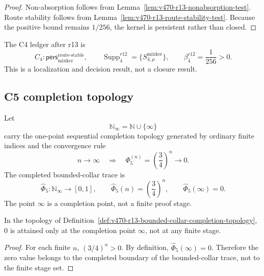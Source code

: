 \begin{proof}
Non-absorption follows from Lemma~\ref{lem:v470-r13-nonabsorption-test}.  Route
stability follows from Lemma~\ref{lem:v470-r13-route-stability-test}.  Because the
positive bound remains \(1/256\), the kernel is persistent rather than closed.
\end{proof}

\begin{corollary}[r13 C4 status]
\label{cor:v470-r13-c4-status}
The C4 ledger after r13 is
\[
C_4:\mathsf{pers}_{\mathrm{mixker}}^{\mathrm{route\mbox{-}stable}},
\qquad
\operatorname{Supp}_4^{r12}=\{S_{4,\mu}^{\mathrm{mixker}}\},
\qquad
\beta_4^{r12}=\frac1{256}>0.
\]
This is a localization and decision result, not a closure result.
\end{corollary}

\subsection{C5 completion topology}
\label{subsec:v470-r13-c5-completion-topology}

\begin{definition}
\label{def:v470-r13-bounded-collar-completion-topology}
Let
\[
\mathbb N_{\infty}=\mathbb N\cup\{\infty\}
\]
carry the one-point sequential completion topology generated by ordinary finite
indices and the convergence rule
\[
n\to\infty \quad\Longrightarrow\quad
\Phi_5^{(n)}=\left(\frac34\right)^n \to 0.
\]
The completed bounded-collar trace is
\[
\widehat{\Phi}_5:\mathbb N_{\infty}\to[0,1],
\qquad
\widehat{\Phi}_5(n)=\left(\frac34\right)^n,
\qquad
\widehat{\Phi}_5(\infty)=0.
\]
The point \(\infty\) is a completion point, not a finite proof stage.
\end{definition}

\begin{lemma}
\label{lem:v470-r13-completion-not-finite-discharge}
In the topology of Definition~\ref{def:v470-r13-bounded-collar-completion-topology},
\(0\) is attained only at the completion point \(\infty\), not at any finite
stage.
\end{lemma}

\begin{proof}
For each finite \(n\), \((3/4)^n>0\).  By definition,
\(\widehat{\Phi}_5(\infty)=0\).  Therefore the zero value belongs to the
completed boundary of the bounded-collar trace, not to the finite stage set.
\end{proof}


